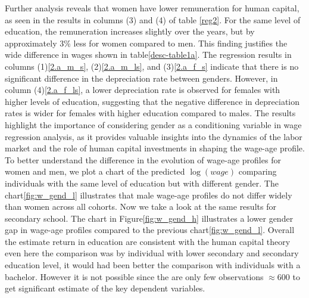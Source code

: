 \documentclass{sistedes}
\begin{document}
Further analysis reveals that women have lower remuneration for human capital, as seen in the results in columns (3) and (4) of table \ref{reg2}. For the same level of education, the remuneration increases slightly over the years, but by approximately 3\% less for women compared to men. This finding justifies the wide difference in wages shown in table\ref{desc-table1a}. 
The regression results in columns (1)\ref{2.a_m_s}, (2)\ref{2.a_m_ls}, and (3)\ref{2.a_f_s} indicate that there is no significant difference in the depreciation rate between genders. However, in column (4)\ref{2.a_f_ls}, a lower depreciation rate is observed for females with higher levels of education, suggesting that the negative difference in depreciation rates is wider for females with higher education compared to males. \newline
The results highlight the importance of considering gender as a conditioning variable in wage regression analysis, as it provides valuable insights into the dynamics of the labor market and the role of human capital investments in shaping the wage-age profile.
To better understand the difference in the evolution of wage-age
profiles for women and men, we plot a chart of the predicted $\log(wage)$ comparing individuals with the same level of education but with different
gender.
\newline
The chart\ref{fig:w_gend_l} illustrates that male wage-age profiles do not differ widely than women across all cohorts. 
Now we take a look at the same results for secondary school. 
\newline
The chart in Figure\ref{fig:w_gend_h} illustrates a lower gender gap in wage-age profiles compared to the previous chart\ref{fig:w_gend_l}. 
\newline
Overall the estimate return in education are consistent with the human capital theory even here the comparison was by
individual with lower secondary and secondary education level, it would had been better the comparison with individuals
with a bachelor. However it is not possible since the are only few observations $\approx 600$ to get significant estimate
of the key dependent variables.
\end{document}
